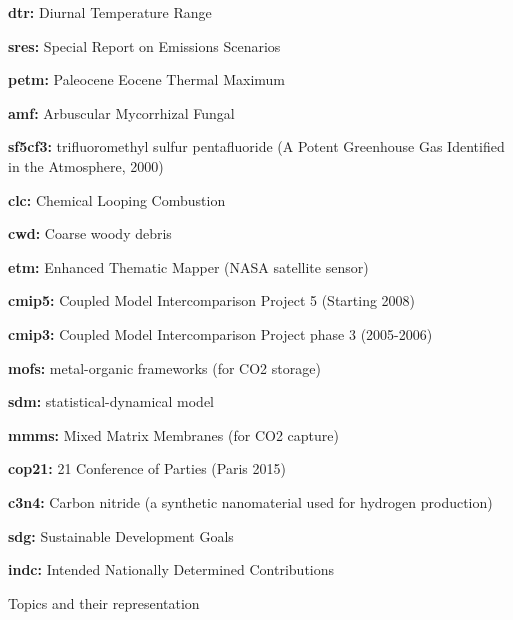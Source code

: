 \documentclass{article}
\begin{document}
\noindent\textbf{dtr:} Diurnal Temperature Range

\noindent\textbf{sres:} Special Report on Emissions Scenarios

\noindent\textbf{petm:} Paleocene Eocene Thermal Maximum

\noindent\textbf{amf:}  Arbuscular Mycorrhizal Fungal

\noindent\textbf{sf5cf3:} trifluoromethyl sulfur pentafluoride (A Potent Greenhouse Gas Identified in the Atmosphere, 2000)

\noindent\textbf{clc:} Chemical Looping Combustion

\noindent\textbf{cwd:} Coarse woody debris

\noindent\textbf{etm:} Enhanced Thematic Mapper (NASA satellite sensor)

\noindent\textbf{cmip5:} Coupled Model Intercomparison Project 5 (Starting 2008)

\noindent\textbf{cmip3:} Coupled Model Intercomparison Project phase 3 (2005-2006)

\noindent\textbf{mofs:} metal-organic frameworks (for CO2 storage)

\noindent\textbf{sdm:} statistical-dynamical model

\noindent\textbf{mmms:} Mixed Matrix Membranes (for CO2 capture)

\noindent\textbf{cop21:} 21 Conference of Parties (Paris 2015) 

\noindent\textbf{c3n4:} Carbon nitride (a synthetic nanomaterial used for hydrogen production)

\noindent\textbf{sdg:} Sustainable Development Goals

\noindent\textbf{indc:} Intended Nationally Determined Contributions

\begin{table}[h!]
	\scriptsize
	
	\caption{Topics and their representation}
	\label{top-topics}
\end{table}	

%	

	
\end{document}
